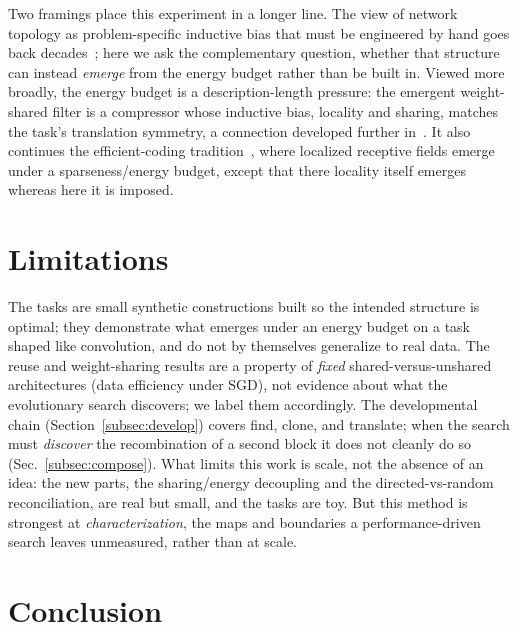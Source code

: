 \documentclass[11pt]{article}
\begin{document}
\medskip\noindent Two framings place this experiment in a longer line. The view of network topology as
problem-specific inductive bias that must be engineered by hand goes back decades~\cite{bpfnn97}; here we
ask the complementary question, whether that structure can instead \emph{emerge} from the energy budget
rather than be built in. Viewed more broadly, the energy budget is a
description-length pressure: the emergent weight-shared filter is a compressor whose inductive bias,
locality and sharing, matches the task's translation symmetry, a connection developed
further in~\cite{compressors}. It also continues the efficient-coding
tradition~\cite{olshausen}, where localized receptive fields emerge under a sparseness/energy budget, except
that there locality itself emerges whereas here it is imposed.

\section{Limitations}

The tasks are small synthetic constructions built so the intended structure is optimal; they demonstrate
what emerges under an energy budget on a task shaped like convolution, and do not by themselves
generalize to real data. The reuse and weight-sharing results are a property of \emph{fixed}
shared-versus-unshared architectures (data efficiency under SGD), not evidence about what the evolutionary
search discovers; we label them accordingly. The developmental chain (Section~\ref{subsec:develop}) covers find, clone, and
translate; when the search must \emph{discover} the recombination of a second block it does not cleanly do
so (Sec.~\ref{subsec:compose}). What limits this work is scale, not the absence of an idea: the new parts,
the sharing/energy decoupling and the directed-vs-random reconciliation, are real but small, and the tasks
are toy. But this method is strongest at \emph{characterization}, the maps and boundaries a
performance-driven search leaves unmeasured, rather than at scale.

\section{Conclusion}
\end{document}
